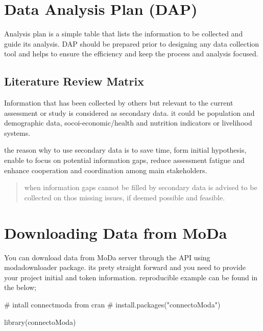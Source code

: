 \documentclass[
  letterpaper,
  DIV=11,
  numbers=noendperiod]{scrreprt}
\newenvironment{Shaded}{\begin{snugshade}}{\end{snugshade}}
\newcommand{\CommentTok}[1]{\textcolor[rgb]{0.37,0.37,0.37}{#1}}
\newcommand{\FunctionTok}[1]{\textcolor[rgb]{0.28,0.35,0.67}{#1}}
\newcommand{\NormalTok}[1]{\textcolor[rgb]{0.00,0.23,0.31}{#1}}
\begin{document}
\section{Data Analysis Plan (DAP)}\label{data-analysis-plan-dap}

Analysis plan is a simple table that lists the information to be
collected and guide its analysis. DAP should be prepared prior to
designing any data collection tool and helps to ensure the efficiency
and keep the process and analysis focused.

\subsection{Literature Review Matrix}\label{literature-review-matrix}

Information that has been collected by others but relevant to the
current assessment or study is considered as secondary data. it could be
population and demographic data, socoi-economic/health and nutrition
indicators or livelihood systems.

the reason why to use secondary data is to save time, form initial
hypothesis, enable to focus on potential information gaps, reduce
assessment fatigue and enhance cooperation and coordination among main
stakeholders.

\begin{quote}
when information gaps cannot be filled by secondary data is advised to
be collected on thos missing issues, if deemed possible and feasible.
\end{quote}

\section{Downloading Data from MoDa}\label{downloading-data-from-moda}

You can download data from MoDa server through the API using
modadownloader package. its prety straight forward and you need to
provide your project initial and token information. reproducible example
can be found in the below;

\begin{Shaded}
\begin{Highlighting}[]
\CommentTok{\# intall connectmoda from cran}
\CommentTok{\# install.packages("connectoModa")}

\FunctionTok{library}\NormalTok{(connectoModa)}
\end{Highlighting}
\end{Shaded}
\end{document}
